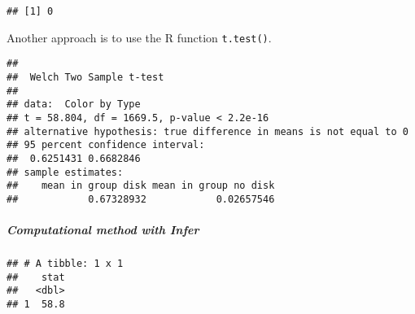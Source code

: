 \documentclass[]{article}
\newenvironment{Shaded}{\begin{snugshade}}{\end{snugshade}}
\newcommand{\DataTypeTok}[1]{\textcolor[rgb]{0.13,0.29,0.53}{#1}}
\newcommand{\KeywordTok}[1]{\textcolor[rgb]{0.13,0.29,0.53}{\textbf{#1}}}
\newcommand{\NormalTok}[1]{#1}
\newcommand{\OperatorTok}[1]{\textcolor[rgb]{0.81,0.36,0.00}{\textbf{#1}}}
\newcommand{\StringTok}[1]{\textcolor[rgb]{0.31,0.60,0.02}{#1}}
\let\oldsubparagraph\subparagraph
\renewcommand{\subparagraph}[1]{\oldsubparagraph{#1}\mbox{}}
\begin{document}
\begin{verbatim}
## [1] 0
\end{verbatim}

Another approach is to use the R function \texttt{t.test()}.

\begin{Shaded}
\end{Shaded}

\begin{verbatim}
## 
##  Welch Two Sample t-test
## 
## data:  Color by Type
## t = 58.804, df = 1669.5, p-value < 2.2e-16
## alternative hypothesis: true difference in means is not equal to 0
## 95 percent confidence interval:
##  0.6251431 0.6682846
## sample estimates:
##    mean in group disk mean in group no disk 
##            0.67328932            0.02657546
\end{verbatim}

\hypertarget{computational-method-with-infer-4}{%
\subparagraph{Computational method with
Infer}\label{computational-method-with-infer-4}}

\begin{Shaded}
\end{Shaded}

\begin{verbatim}
## # A tibble: 1 x 1
##    stat
##   <dbl>
## 1  58.8
\end{verbatim}
\end{document}
